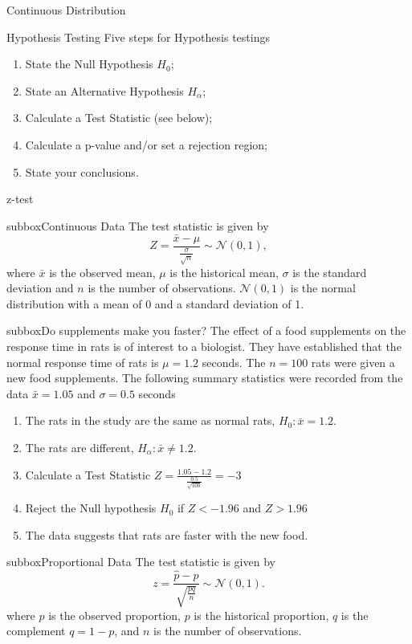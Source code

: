 \documentclass[10pt,a4paper]{article}
\begin{document}
\begin{multicols}{3}
\begin{textbox}{Continuous Distribution}
\end{textbox}
\begin{textbox}{Hypothesis Testing}
Five steps for Hypothesis testings
\begin{enumerate}
\item  State the Null Hypothesis $H_0$;
\item  State an Alternative Hypothesis $H_{\alpha}$;
\item  Calculate a Test Statistic (see below);
\item  Calculate a p-value and/or set a rejection region;
\item  State your conclusions.
\end{enumerate}
\end{textbox}
\begin{textbox}{z-test}
\begin{subbox}{subbox}{Continuous Data}
The test statistic is given by
\[Z=\frac{\bar{x}-\mu}{\frac{\sigma}{\sqrt{n}}} \sim \mathcal{N}(0,1), \]
where $\bar{x}$ is the observed mean, $\mu$ is the historical mean, $\sigma$ is the standard deviation and $n$ is the number of observations.
$\mathcal{N}(0,1)$ is the normal distribution with a mean of 0 and a standard deviation of 1.
\begin{subbox}{subbox}{Do supplements make you faster? }
\tiny
The effect of a food supplements on the response time in rats is of interest to a biologist. They have established that the normal response time of rats is $\mu=1.2$ seconds. The $n=100$ rats were given a new food supplements. The following summary statistics were recorded from the data $\bar{x}=1.05$ and $\sigma= 0.5$ seconds
\begin{enumerate}
    \item The rats in the study are the same as normal rats,  $H_0 : \bar{x}=1.2$. 
\item The rats are different, $H_\alpha:\bar{x}\not= 1.2$.
\item Calculate a Test Statistic $Z=\frac{1.05-1.2}{\frac{0.5}{\sqrt{100}}}=-3 $
\item Reject the Null hypothesis $H_0$ if $Z<-1.96$ and $Z>1.96$
\item The data suggests that rats are faster with the new food.
\end{enumerate}


\end{subbox}
\end{subbox}
\begin{subbox}{subbox}{Proportional Data}
The test statistic is given by
\[z=\frac{\hat{p}-p}{\sqrt{\frac{pq}{n}}} \sim \mathcal{N}(0,1). \]
where $\hat{p}$ is the observed proportion, $p$ is the historical proportion, $q$ is the complement $q=1-p$,  and $n$ is the number of observations.


\end{subbox}
\end{textbox}
\end{multicols}
\end{document}
